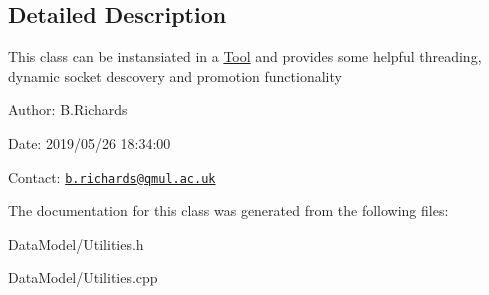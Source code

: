 \subsection{Detailed Description}
This class can be instansiated in a \hyperlink{classTool}{Tool} and provides some helpful threading, dynamic socket descovery and promotion functionality

\begin{DoxyParagraph}{Author\-:}
B.\-Richards 
\end{DoxyParagraph}
\begin{DoxyParagraph}{Date\-:}
2019/05/26 18\-:34\-:00 
\end{DoxyParagraph}
Contact\-: \href{mailto:b.richards@qmul.ac.uk}{\tt b.\-richards@qmul.\-ac.\-uk} 

The documentation for this class was generated from the following files\-:\begin{DoxyCompactItemize}
\item 
Data\-Model/Utilities.\-h\item 
Data\-Model/Utilities.\-cpp\end{DoxyCompactItemize}
